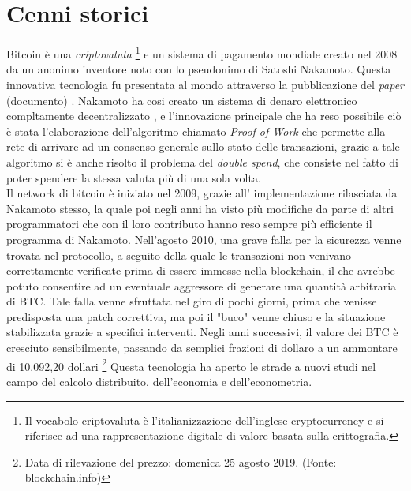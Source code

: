 \section{Cenni storici}
Bitcoin  \`e una \textit{criptovaluta} \footnote{Il vocabolo criptovaluta \`e l'italianizzazione dell'inglese cryptocurrency e si riferisce ad una rappresentazione digitale di valore basata sulla crittografia.} e un sistema di pagamento mondiale creato nel 2008 da un anonimo inventore noto con lo pseudonimo di Satoshi Nakamoto. Questa innovativa tecnologia fu presentata al mondo attraverso la pubblicazione del \textit{paper} (documento) \cite{nakamoto2008bitcoin}. Nakamoto ha cosi creato un sistema di denaro elettronico compltamente decentralizzato \cite{tschorsch2016bitcoin}, e l'innovazione principale che ha reso possibile ci\`o \`e stata l'elaborazione dell'algoritmo chiamato \textit{Proof-of-Work} che permette alla rete di arrivare ad un consenso generale sullo stato delle transazioni, grazie a tale algoritmo si \`e anche risolto il problema del \textit{double spend}, che consiste nel fatto di poter spendere la stessa valuta pi\`u di una sola volta.\\
Il network di bitcoin \`e iniziato nel 2009, grazie all' implementazione rilasciata da Nakamoto stesso, la quale poi negli anni ha visto pi\`u modifiche da parte di altri programmatori che con il loro contributo hanno reso sempre pi\`u efficiente il programma di Nakamoto. 
Nell'agosto 2010, una grave falla per la sicurezza venne trovata nel protocollo, a seguito della quale le
transazioni non venivano correttamente verificate prima di essere immesse nella blockchain, il che avrebbe potuto consentire ad un eventuale aggressore di generare una quantit\`a arbitraria di BTC. Tale falla venne sfruttata nel giro di pochi giorni, prima che venisse predisposta una patch correttiva, ma poi il "buco" venne chiuso e la situazione stabilizzata grazie a specifici interventi.
Negli anni successivi, il valore dei BTC \`e cresciuto sensibilmente, passando da semplici frazioni di dollaro a un ammontare di 10.092,20 dollari  \footnote{Data di rilevazione del prezzo: domenica 25 agosto 2019. (Fonte: blockchain.info)}
Questa tecnologia ha aperto le strade a nuovi studi nel campo del calcolo distribuito, dell'economia e dell'econometria.
